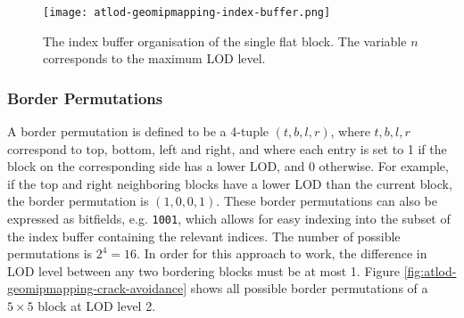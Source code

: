 \begin{figure}[H]
  \centering
  \texttt{[image: atlod-geomipmapping-index-buffer.png]}
  \caption{The index buffer organisation of the single flat block. The variable $n$ corresponds to the maximum LOD level.}\label{fig:atlod-geomipmapping-index-buffers}
\end{figure}

\subsubsection{Border Permutations}
A border permutation is defined to be a 4-tuple $(t,b,l,r)$,
where $t,b,l,r$ correspond to top, bottom, left and right, and where each entry is set to 1 if the block on 
the corresponding side has a lower LOD, and 0 otherwise. For example, if the top and right neighboring blocks
have a lower LOD than the current block, the border permutation is $(1,0,0,1)$.
These border permutations can also be expressed as bitfields, e.g. \texttt{1001},
which allows for easy indexing into the subset of the index buffer containing the relevant indices.
The number of possible permutations is $2^4=16$.
In order for this approach to work, the difference in LOD level between any two bordering blocks 
must be at most 1. 
Figure \ref{fig:atlod-geomipmapping-crack-avoidance} shows all possible border permutations of a $5 \times 5$ block at LOD level 2.

